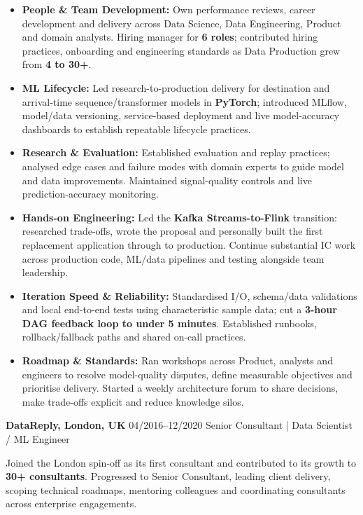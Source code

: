 \documentclass[]{../../../../friggeri-cv}
\renewcommand{\entry}[4]{%
  \parbox[t]{\dimexpr\textwidth-\entryleftinset\relax}{%
    \textbf{#2}%
    {\footnotesize\addfontfeature{Color=lightgray}\hspace{0.6em}#1}%
    \hfill%
    {\small\color{textcolor} #3}\\%
    #4\vspace{\parsep}%
  }\\}
\begin{document}
\begin{entrylist}
{{        }
        \begin{itemize}[leftmargin=1.1em, itemsep=2pt, topsep=3pt, parsep=0pt]
            \item \small\textbf{People \& Team Development:} Own performance reviews, career development and delivery across Data Science, Data Engineering, Product and domain analysts. Hiring manager for \textbf{6 roles}; contributed hiring practices, onboarding and engineering standards as Data Production grew from \textbf{4 to 30+}.
            \item \small\textbf{ML Lifecycle:} Led research-to-production delivery for destination and arrival-time sequence/transformer models in \textbf{PyTorch}; introduced MLflow, model/data versioning, service-based deployment and live model-accuracy dashboards to establish repeatable lifecycle practices.
            \item \small\textbf{Research \& Evaluation:} Established evaluation and replay practices; analysed edge cases and failure modes with domain experts to guide model and data improvements. Maintained signal-quality controls and live prediction-accuracy monitoring.
            \item \small\textbf{Hands-on Engineering:} Led the \textbf{Kafka Streams-to-Flink} transition: researched trade-offs, wrote the proposal and personally built the first replacement application through to production. Continue substantial IC work across production code, ML/data pipelines and testing alongside team leadership.
            \item \small\textbf{Iteration Speed \& Reliability:} Standardised I/O, schema/data validations and local end-to-end tests using characteristic sample data; cut a \textbf{3-hour DAG feedback loop to under 5 minutes}. Established runbooks, rollback/fallback paths and shared on-call practices.
            \item \small\textbf{Roadmap \& Standards:} Ran workshops across Product, analysts and engineers to resolve model-quality disputes, define measurable objectives and prioritise delivery. Started a weekly architecture forum to share decisions, make trade-offs explicit and reduce knowledge silos.
        \end{itemize}
    }
    \entry
    {04/2016--12/2020}
    {DataReply, London, UK}
    {Senior Consultant | Data Scientist / ML Engineer}
    {
        {\small
        \setlength{\parindent}{0pt}
        \setlength{\leftskip}{0pt}
        Joined the London spin-off as its first consultant and contributed to its growth to \textbf{30+ consultants}. Progressed to Senior Consultant, leading client delivery, scoping technical roadmaps, mentoring colleagues and coordinating consultants across enterprise engagements.

}}
\end{entrylist}
\end{document}
